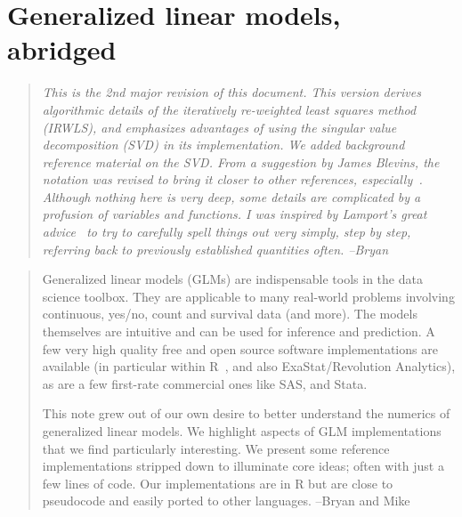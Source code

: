 \documentclass[10pt]{article} %
\begin{document}

\setlength{\parindent}{0pt}
\setlength{\parskip}{0.2em}



\section*{Generalized linear models, abridged}

\begin{quote}
{\it This is the 2nd major revision of this document. This version derives
algorithmic details of the iteratively re-weighted least squares method
(IRWLS), and emphasizes advantages of using the singular value decomposition
(SVD) in its implementation. We added background reference material on the SVD.
From a suggestion by James Blevins, the notation was revised to bring it closer
to other references, especially~\cite{MN}.  Although nothing here is very
deep, some details are complicated by a profusion of variables and functions.
I was inspired by Lamport's great advice~\cite{lamport} to try to
carefully spell things out very simply, step by step, referring back to
previously established quantities often.  --Bryan}
\end{quote}

\begin{quote}
Generalized linear models (GLMs) are indispensable tools in the data science
toolbox. They are applicable to many real-world problems involving continuous,
yes/no, count and survival data (and more). The models themselves are intuitive
and can be used for inference and prediction.  A few very high quality free and
open source software implementations are available (in particular within
R~\cite{R}, and also ExaStat/Revolution Analytics), as are a few first-rate
commercial ones like SAS, and Stata.

This note grew out of our own desire to better understand the numerics of
generalized linear models.  We highlight aspects of GLM implementations that we
find particularly interesting. We present some reference implementations
stripped down to illuminate core ideas; often with just a few lines of code.
Our implementations are in R but are close to pseudocode and easily ported to
other languages. --Bryan and Mike
\end{quote}
\end{document}
